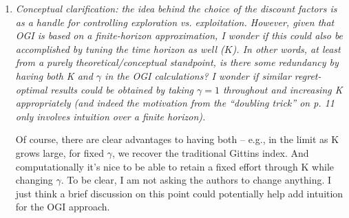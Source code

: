 \documentclass[11pt]{article}
\newcommand{\1}{\ensuremath{\mathbf{1}}} %
\theoremstyle{thm-sf}
\begin{document}
\begin{enumerate}
{\em (b) when approximations are used (e.g., Powell and Ryzhov 2012) can you please briefly discuss how good these approximations are?} TBD

As a final point, it is perhaps worth noting that a uniform approximation to the exact Gittins index while interesting is {\em not} a prerequisite for adequate performance. For instance, our main theorem applies to the $K=1$ case, where one may not hope for a uniform approximation guarantee to the Gittins index itself. Put a different way, the value of optimistic approximations to the Gittins index is not that they provide uniformly good approximations to the index itself, but rather that they allow for low regret. In that sense, Tables 7 and 8 are perhaps a distraction, and we are happy to remove them altogether. 

		
		
		\item {\it Conceptual clarification: the idea behind the choice of the discount factors is as a handle for controlling exploration vs. exploitation. However, given that OGI is based on a finite-horizon approximation, I wonder if this could also be accomplished by tuning the time horizon as well ($K$). In other words, at least from a purely theoretical/conceptual standpoint, is there some redundancy by having both K and $\gamma$ in the OGI calculations? I wonder if similar regret-optimal results could be obtained by taking $\gamma=1$ throughout and increasing K appropriately (and indeed the motivation from the “doubling trick” on p. 11 only involves intuition over a finite horizon).
	   
	   Of course, there are clear advantages to having both – e.g., in the limit as K grows large, for fixed $\gamma$, we recover the traditional Gittins index. And computationally it’s nice to be able to retain a fixed effort through K while changing $\gamma$.
	   To be clear, I am not asking the authors to change anything. I just think a brief discussion on this point could potentially help add intuition for the OGI approach.	
	}


\end{enumerate}
\end{document}
